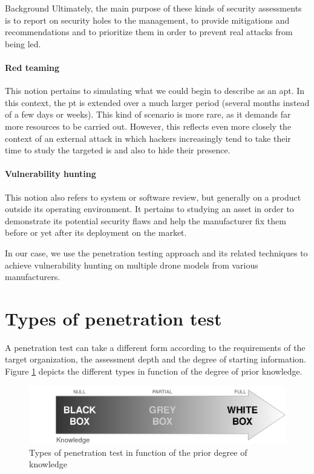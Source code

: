 \begin{chaptercover}{Background}
Ultimately, the main purpose of these kinds of security assessments is to report on security holes to the management, to provide mitigations and recommendations and to prioritize them in order to prevent real attacks from being led.

\paragraph{Red teaming} This notion pertains to simulating what we could begin to describe as an \acrfull{apt}. In this context, the \acrshort{pt} is extended over a much larger period (several months instead of a few days or weeks). This kind of scenario is more rare, as it demands far more resources to be carried out. However, this reflects even more closely the context of an external attack in which hackers increasingly tend to take their time to study the targeted \acrshort{is} and also to hide their presence.

\paragraph{Vulnerability hunting} This notion also refers to system or software review, but generally on a product outside its operating environment. It pertains to studying an asset in order to demonstrate its potential security flaws and help the manufacturer fix them before or yet after its deployment on the market.

\begin{info} 
In our case, we use the penetration testing approach and its related techniques to achieve vulnerability hunting on multiple drone models from various manufacturers.
\end{info}

\section{Types of penetration test}

A penetration test can take a different form according to the requirements of the target organization, the assessment depth and the degree of starting information. Figure \ref{fig:pentest-types} depicts the different types in function of the degree of prior knowledge.

\begin{figure}[H]
  \centering
  \includegraphics[width=.7\linewidth]{figures/pentest-types}
  \caption{Types of penetration test in function of the prior degree of knowledge}
  \label{fig:pentest-types}
\end{figure}


\end{chaptercover}
